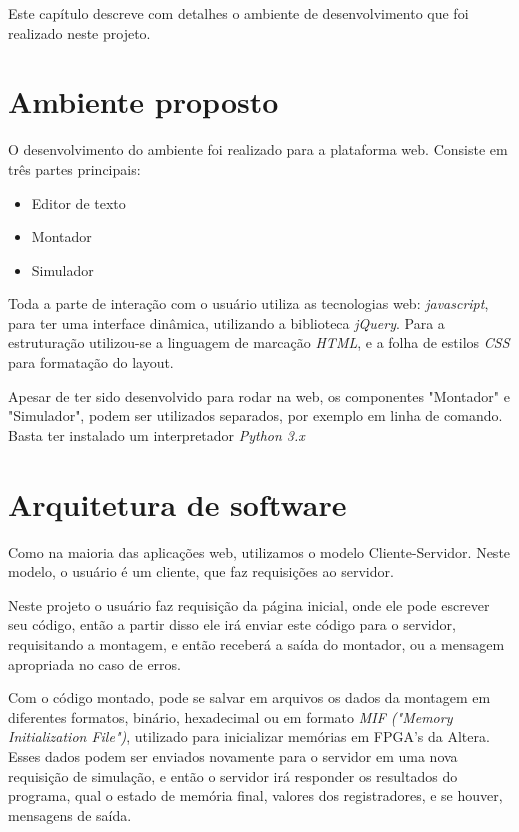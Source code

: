 Este capítulo descreve com detalhes o ambiente de desenvolvimento que foi realizado neste projeto.

\section{Ambiente proposto}%

	O desenvolvimento do ambiente foi realizado para a plataforma web. Consiste em três partes principais:
	
	\begin{itemize}
		\item Editor de texto
		\item Montador
		\item Simulador
	\end{itemize}

	Toda a parte de interação com o usuário utiliza as tecnologias web: \textit{javascript}, para ter uma interface dinâmica, utilizando a biblioteca \textit{jQuery}. Para a estruturação utilizou-se a linguagem de marcação \textit{HTML}, e a folha de estilos \textit{CSS} para formatação do layout.

	Apesar de ter sido desenvolvido para rodar na web, os componentes "Montador" e "Simulador", podem ser utilizados separados, por exemplo em linha de comando. Basta ter instalado um interpretador \textit{Python 3.x}


\section{Arquitetura de software}

	Como na maioria das aplicações web, utilizamos o modelo Cliente-Servidor. Neste modelo, o usuário é um cliente, que faz requisições ao servidor. 

	Neste projeto o usuário faz requisição da página inicial, onde ele pode escrever seu código, então a partir disso ele irá enviar este código para o servidor, requisitando a montagem, e então receberá a saída do montador, ou a mensagem apropriada no caso de erros.

	Com o código montado, pode se salvar em arquivos os dados da montagem em diferentes formatos, binário, hexadecimal ou em formato \textit{MIF ("Memory Initialization File")}, utilizado para inicializar memórias em FPGA's da Altera. Esses dados podem ser enviados novamente para o servidor em uma nova requisição de simulação, e então o servidor irá responder os resultados do programa, qual o estado de memória final, valores dos registradores, e se houver, mensagens de saída.



